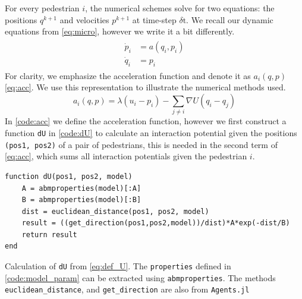 For every pedestrian $i$, the numerical schemes solve for two equations: the positions $q^{k+1}$ and velocities $p^{k+1}$ at time-step $\delta \text{t}$. We recall our dynamic equations from \autoref{eq:micro}, however we write it a bit differently.
\begin{gather}
    \begin{aligned}
    \dot p_i &= a(q_i,p_i) \\
    \dot q_i &= p_i
    \end{aligned}
    \label{eq:diff_pq}
\end{gather}
For clarity, we emphasize the acceleration function and denote it as $a_i(q,p)$ \autoref{eq:acc}. We use this representation to illustrate the numerical methods used.
\begin{equation}
    a_i(q,p) = \lambda(u_i - p_i) - \sum_{j \neq i} \nabla U(q_i - q_j)
    \label{eq:acc}
\end{equation}
In \autoref{code:acc} we define the acceleration function, however we first construct a function \texttt{dU} in \autoref{code:dU} to calculate an interaction potential given the positions \texttt{(pos1, pos2)} of a pair of pedestrians, this is needed in the second term of \autoref{eq:acc}, which sums all interaction potentials given the pedestrian $i$.
\begin{listing}[H]
\begin{verbatim}
function dU(pos1, pos2, model)
    A = abmproperties(model)[:A]
    B = abmproperties(model)[:B]
    dist = euclidean_distance(pos1, pos2, model)
    result = ((get_direction(pos1,pos2,model))/dist)*A*exp(-dist/B)
    return result
end
\end{verbatim}
\caption{Calculation of \texttt{dU} from \autoref{eq:def_U}. The \texttt{properties} defined in \autoref{code:model_param} can be extracted using \texttt{abmproperties}. The methods \texttt{euclidean\_distance}, and \texttt{get\_direction} are also from \texttt{Agents.jl}}
\label{code:dU}
\end{listing}

